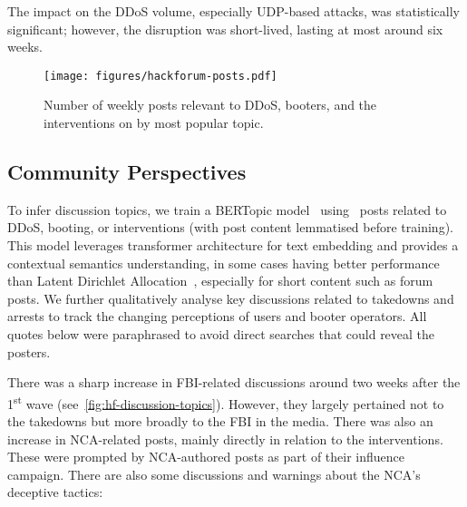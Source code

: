 \documentclass[letterpaper,twocolumn,10pt]{article}
\begin{document}
 The impact on the DDoS volume, especially UDP-based attacks, was statistically significant; however, the disruption was short-lived, lasting at most around six weeks.

\begin{figure}[t]
    \centering
    \texttt{[image: figures/hackforum-posts.pdf]}\\
    \caption{Number of weekly posts relevant to DDoS, booters, and the interventions on \hackforums by most popular topic.}
    \label{fig:hf-discussion-topics}
\end{figure}

\subsection{Community Perspectives}
To infer discussion topics, we train a BERTopic model~\cite{grootendorst2022bertopic} using \BTnAllRelevantPosts~\hackforums posts related to DDoS, booting, or interventions (with post content lemmatised before training). This model leverages transformer architecture for text embedding and provides a contextual semantics understanding, in some cases having better performance than Latent Dirichlet Allocation~\cite{blei2003latent}, especially for short content such as forum posts. We further qualitatively analyse key discussions related to takedowns and arrests to track the changing perceptions of users and booter operators. All quotes below were paraphrased to avoid direct searches that could reveal the posters.

 There was a sharp increase in FBI-related discussions around two weeks after the 1\textsuperscript{st} wave (see~\autoref{fig:hf-discussion-topics}). However, they largely pertained not to the takedowns but more broadly to the FBI in the media. There was also an increase in NCA-related posts, mainly directly in relation to the interventions. These were prompted by NCA-authored posts as part of their influence campaign. There are also some discussions and warnings about the NCA's deceptive tactics:

\begingroup
\addtolength\leftmargini{-0.15in}
\begin{quote}
\end{quote}
\endgroup
\end{document}
